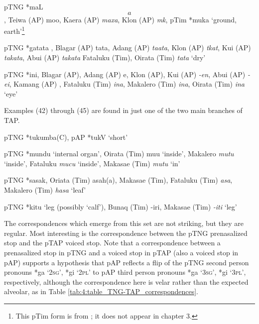 \ea%
   pTNG *maL\[a\], Teiwa (AP) mo{\pharfric}o{\textglotstop}, Kaera (AP) \textit{maxa}, Klon (AP) \textit{m{\textschwa}k{\textepsilon}{\textglotstop}}, pTim *muka `ground, earth'\footnote{This pTim form is from \citet{SchapperEtAl2012historical}; it does not appear in chapter 3. }  
 

\z

\ea%
   pTNG *gatata , Blagar (AP) tata, Adang (AP) \textit{ta}\textit{{\textglotstop}}\textit{ata}, Klon (AP) \textit{t}\textit{{\textschwa}}\textit{kat}, Kui (AP) \textit{takata}, Abui (AP) \textit{takata} Fataluku (Tim), Oirata (Tim) \textit{tata} `dry'  
 

\z

\ea%
pTNG *ini, Blagar (AP), Adang (AP) e{\ng}, Klon (AP), Kui (AP) \textit{-en}, Abui (AP) \textit{-ei{\ng}}, Kamang (AP) \textit{{\ng}}, Fataluku (Tim) \textit{ina}, Makalero (Tim) \textit{ina}, Oirata (Tim) \textit{ina} `eye' 
   \z

Examples (42) through (45) are found in just one of the two main branches of TAP.

\ea%
   pTNG *tukumba(C), pAP *tukV `short'  
\z

\ea%
   pTNG *mundu `internal organ', Oirata (Tim) mu{\textrtailt}u `inside', Makalero \textit{mutu} `inside', Fataluku \textit{mucu }`inside', Makasae (Tim) \textit{mutu }`in'  
\z

\ea%
   pTNG *sasak, Oriata (Tim) asah(a), Makasae (Tim), Fataluku (Tim) \textit{asa}, Makalero (Tim) \textit{hasa }`leaf'   
\z

\ea%
   pTNG *kitu `leg (possibly `calf'), Bunaq (Tim) -iri, Makasae (Tim) \textit{-iti} `leg'  
\z

The correspondences which emerge from this set are not striking, but they are regular. Most interesting is the correspondence between the pTNG prenasalized stop and the pTAP voiced stop. Note that a correspondence between a prenasalized stop in pTNG and a voiced stop in pTAP (also a voiced stop in pAP) supports a hypothesis that pAP reflects a flip of the pTNG second person pronouns *{\ng}ga `\textsc{2sg}', *{\ng}gi `\textsc{2pl}' to pAP third person pronouns *ga `\textsc{3sg}', *gi `\textsc{3pl}', respectively, although the correspondence here is velar rather than the expected alveolar, as in Table \ref{tab:4:table_TNG-TAP_correspondences}.


